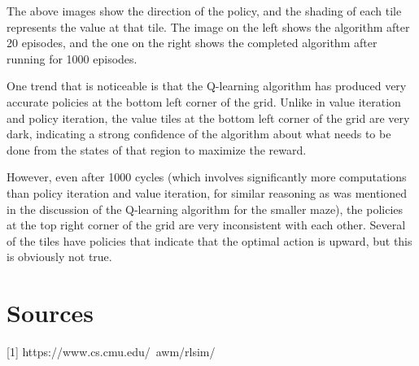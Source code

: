 \documentclass[11pt]{article}
\begin{document}
            The above images show the direction of the policy, and the shading
            of each tile represents the value at that tile. The image on the left
            shows the algorithm after 20 episodes, and the one on the right shows
            the completed algorithm after running for 1000 episodes.

            One trend that is noticeable is that the Q-learning algorithm has produced
            very accurate policies at the bottom left corner of the grid. Unlike in value
            iteration and policy iteration, the value tiles at the bottom left corner of
            the grid are very dark, indicating a strong confidence of the algorithm about
            what needs to be done from the states of that region to maximize the reward.

            However, even after 1000 cycles (which involves significantly more computations
            than policy iteration and value iteration, for similar reasoning as was
            mentioned in the discussion of the Q-learning algorithm for the smaller maze),
            the policies at the top right corner of the grid are very inconsistent
            with each other. Several
            of the tiles have policies that indicate that the optimal action is upward, but
            this is obviously not true.
        \section{Sources}
        
        [1] https://www.cs.cmu.edu/~awm/rlsim/

    
\end{document}
